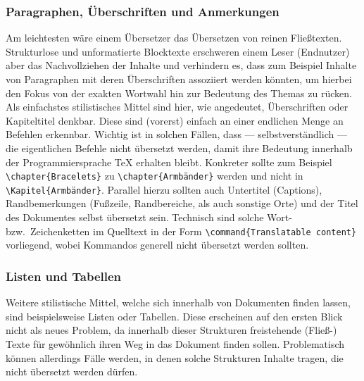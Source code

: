 \subsubsection{Paragraphen, Überschriften und Anmerkungen}\label{subsubsec:problems:texts}%
Am leichtesten wäre einem Übersetzer das Übersetzen von reinen Fließtexten. Strukturlose und unformatierte Blocktexte erschweren einem Leser (Endnutzer) aber das Nachvollziehen der Inhalte und verhindern es, dass zum Beispiel Inhalte von Paragraphen mit deren Überschriften assoziiert werden könnten, um hierbei den Fokus von der exakten Wortwahl hin zur Bedeutung des Themas zu rücken.%
Als einfachstes stilistisches Mittel sind hier, wie angedeutet, Überschriften oder Kapiteltitel denkbar. Diese sind (vorerst) einfach an einer endlichen Menge an Befehlen erkennbar. Wichtig ist in solchen Fällen, dass --- selbstverständlich --- die eigentlichen Befehle nicht übersetzt werden, damit ihre Bedeutung innerhalb der Programmiersprache \TeX{} erhalten bleibt. Konkreter sollte zum Beispiel \verb|\chapter{Bracelets}| zu \verb|\chapter{Armbänder}| werden und nicht in \verb|\Kapitel{Armbänder}|.
Parallel hierzu sollten auch Untertitel (Captions), Randbemerkungen (Fußzeile, Randbereiche, als auch sonstige Orte) und der Titel des Dokumentes selbst übersetzt sein. Technisch sind solche Wort- bzw.\ Zeichenketten im Quelltext in der Form \verb|\command{Translatable content}| vorliegend, wobei Kommandos generell nicht übersetzt werden sollten.

\subsubsection{Listen und Tabellen}%
Weitere stilistische Mittel, welche sich innerhalb von Dokumenten finden lassen, sind beispielsweise Listen oder Tabellen. Diese erscheinen auf den ersten Blick nicht als neues Problem, da innerhalb dieser Strukturen freistehende (Fließ-) Texte für gewöhnlich ihren Weg in das Dokument finden sollen. Problematisch können allerdings Fälle werden, in denen solche Strukturen Inhalte tragen, die nicht übersetzt werden dürfen.  

